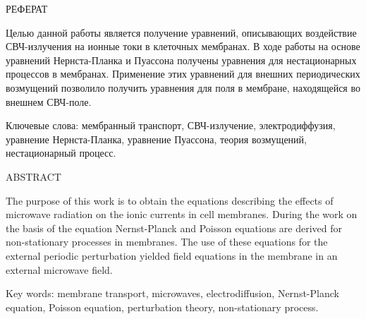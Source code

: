 \setcounter{page}{4}
\begin{center}
РЕФЕРАТ
\end{center}
Целью данной работы является получение уравнений, описывающих воздействие
СВЧ-излучения на ионные токи в клеточных мембранах. В ходе работы на основе
уравнений Нернста-Планка и Пуассона получены уравнения для нестационарных
процессов в мембранах. Применение этих уравнений для внешних периодических
возмущений позволило получить уравнения для поля в мембране, находящейся во
внешнем СВЧ-поле.
\vspace*{1cm}

\noindent Ключевые слова: мембранный транспорт, СВЧ-излучение,
электродиффузия, уравнение Нернста-Планка, уравнение Пуассона, теория
возмущений, нестационарный процесс.
\vspace*{1cm}

\begin{center}
    ABSTRACT
\end{center}

The purpose of this work is to obtain the equations describing the effects of
microwave radiation on the ionic currents in cell membranes. During the work
on the basis of the equation Nernst-Planck and Poisson equations are derived
for non-stationary processes in membranes. The use of these equations for the
external periodic perturbation yielded field equations in the membrane in an
external microwave field.
\vspace*{1cm}

\noindent Key words: membrane transport, microwaves, electrodiffusion,
Nernst-Planck equation, Poisson equation, perturbation theory,
non-stationary process.
